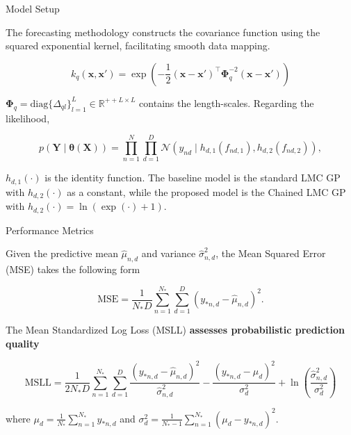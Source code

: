 \begin{frame}{Model Setup}

\begin{block}{}
	The forecasting methodology constructs the covariance function using the squared exponential kernel, facilitating smooth data mapping.
\end{block}


\[
	k_{q}\left(\boldsymbol{x}, \boldsymbol{x}' \right) = \exp\left(-\frac{1}{2}(\boldsymbol{x} - \boldsymbol{x}')^\top \boldsymbol{\Phi}_q^{-2} (\boldsymbol{x} - \boldsymbol{x}')\right)
\]

\begin{block}{}
\( \boldsymbol{\Phi}_q=\text{diag}\{\Delta_{ql}\}_{l=1}^{L} \in \mathbb{R}^{++L \times L} \) contains the length-scales. Regarding the likelihood,
\end{block}

\[
	p(\boldsymbol{Y} \mid \boldsymbol{\theta}(\boldsymbol{X})) = \prod_{n=1}^{N}\prod_{d=1}^{D} \mathcal{N}\left(y_{nd} \mid h_{d,1}(f_{nd,1}), h_{d,2}(f_{nd,2}) \right),
\]

\begin{block}{}
$h_{d,1}(\cdot)$ is the identity function. The baseline model is the standard LMC GP with $h_{d,2}(\cdot)$ as a constant, while the proposed model is the Chained LMC GP with $h_{d,2}(\cdot) = \ln(\exp(\cdot)+1)$.
\end{block}

\end{frame}


\begin{frame}{Performance Metrics}

\begin{block}{}
	Given the predictive mean \( \hat{\mu}_{n,d}\) and variance \( \hat{\sigma}^2_{n,d}\), the Mean Squared Error (MSE) takes the following form
\end{block}

\[
	\text{MSE} = \frac{1}{N_{*}D} \sum_{n=1}^{N_*} \sum_{d=1}^{D} \left( y_{*n,d} - \hat{\mu}_{n,d} \right)^2.
\]

\begin{block}{}
The Mean Standardized Log Loss (MSLL) \textcolor{BrandTeal}{\textbf{assesses probabilistic prediction quality}}~\cite{RasmussenW06}
\end{block}

\[
	\text{MSLL} = \frac{1}{2N_{*}D} \sum_{n=1}^{N_*} \sum_{d=1}^{D}  \frac{(y_{*n,d} - \hat{\mu}_{n,d} )^2}{\hat{\sigma}^2_{n,d}}
	- \frac{(y_{*n,d} - \mu_d)^2}{\sigma_d^2} + \ln \left(\frac{\hat{\sigma}^2_{n,d}}{\sigma_d^2}\right)
\]

\begin{block}{}
	where \( \mu_d = \frac{1}{N_*} \sum_{n=1}^{N_*} y_{*n,d}\) and \( \sigma_d^2 = \frac{1}{N_* - 1} \sum_{n=1}^{N_*} (\mu_d - y_{*n,d})^2 \).
\end{block}

\end{frame}

